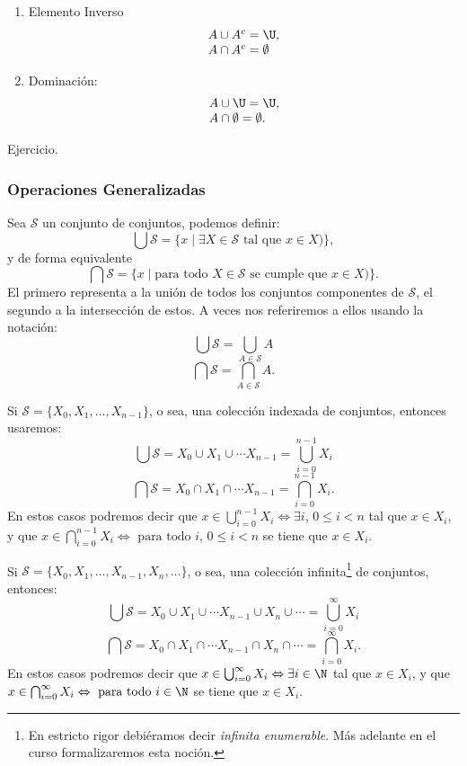 \begin{teorema}
\begin{multicols}{2}
\begin{enumerate}
  \item Elemento Inverso
  \[
  \begin{array}{l}
  A\cup A^c=\U, \\ A\cap A^c=\emptyset
  \end{array}
  \]
  
  \item Dominación: 
  \[
  \begin{array}{l}
  A\cup\U=\U,\\ A\cap\emptyset=\emptyset.
  \end{array}
  \]
\end{enumerate}
\end{multicols}
\begin{demostracion}
Ejercicio.
\end{demostracion}
\end{teorema}

\subsubsection{Operaciones Generalizadas}
Sea $\mathcal{S}$ un conjunto de conjuntos, podemos definir:
\[
\bigcup \mathcal{S}=\{x\;|\;\exists X\in\mathcal{S}\text{ tal que }x\in X)\},
\]
y de forma equivalente
\[
\bigcap \mathcal{S}=\{x\;|\;\text{para todo } X\in\mathcal{S}\text{ se cumple que }x\in X)\}.
\]
El primero representa a la unión de todos los conjuntos componentes de $\mathcal{S}$, el segundo a la intersección de estos.
A veces nos referiremos a ellos usando la notación:
\[
\bigcup \mathcal{S}=\bigcup_{A\in\mathcal{S}}A
\]
\[
\bigcap\mathcal{S}=\bigcap_{A\in\mathcal{S}}A.
\]

Si $\mathcal{S}=\{X_0,X_1,\ldots,X_{n-1}\}$, o sea, una colección indexada de conjuntos, entonces usaremos:
\[
\bigcup \mathcal{S}=X_0\cup X_1\cup\cdots X_{n-1}=\bigcup_{i=0}^{n-1}X_i
\]
\[
\bigcap \mathcal{S}=X_0\cap X_1\cap\cdots X_{n-1}=\bigcap_{i=0}^{n-1}X_i.
\]
En estos casos podremos decir que $x\in\bigcup_{i=0}^{n-1}X_i\Leftrightarrow \exists i$, $0\leq i<n$ tal que $x\in X_i$, y que $x\in\bigcap_{i=0}^{n-1}X_i\Leftrightarrow \text{ para todo } i$, $0\leq i<n$ se tiene que $x\in X_i$.

Si $\mathcal{S}=\{X_0,X_1,\ldots,X_{n-1},X_n,\ldots\}$, o sea, una colección infinita\footnote{En estricto rigor debiéramos decir \emph{infinita enumerable}.
Más adelante en el curso formalizaremos esta noción.} de conjuntos, entonces:
\[
\bigcup \mathcal{S}=X_0\cup X_1\cup\cdots X_{n-1}\cup X_n\cup\cdots=\bigcup_{i=0}^\infty X_i
\]\[
\bigcap \mathcal{S}=X_0\cap X_1\cap\cdots X_{n-1}\cap X_n\cap\cdots=\bigcap_{i=0}^\infty X_i.
\]
En estos casos podremos decir que $x\in\bigcup_{i=0}^\infty X_i\Leftrightarrow \exists i\in\N$ tal que $x\in X_i$, y que $x\in\bigcap_{i=0}^\infty X_i\Leftrightarrow \text{ para todo } i\in\N$ se tiene que $x\in X_i$.

